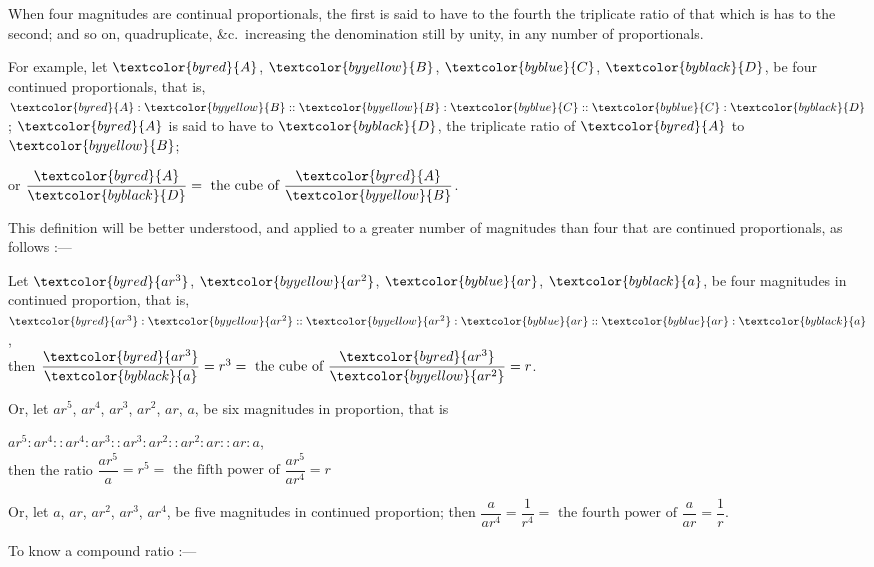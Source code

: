 \documentclass[booklanguage=english]{byrnebook}
\begin{document}
\vfill\pagebreak

\def\varA{\textcolor{byred}{A}}
\def\varB{\textcolor{byyellow}{B}}
\def\varC{\textcolor{byblue}{C}}
\def\varD{\textcolor{byblack}{D}}
\def\vararQ{\textcolor{byred}{ar^3}}
\def\vararS{\textcolor{byyellow}{ar^2}}
\def\varar{\textcolor{byblue}{ar}}
\def\vara{\textcolor{byblack}{a}}
When four magnitudes are continual proportionals, the first is said to have to the fourth the triplicate ratio of that which is has to the second; and so on, quadruplicate, \&c.\ increasing the denomination still by unity, in any number of proportionals.

For example, let $\varA$, $\varB$, $\varC$, $\varD$, be four continued proportionals, that is, $\varA : \varB :: \varB : \varC :: \varC : \varD$; $\varA$ is said to have to $\varD$, the triplicate ratio of $\varA$ to $\varB$;

\begin{center}
or $\dfrac{\varA}{\varD} = \mbox{ the cube of } \dfrac{\varA}{\varB}$.
\end{center}

This definition will be better understood, and applied to a greater number of magnitudes than four that are continued proportionals, as follows :—

\begin{center}
Let $\vararQ$, $\vararS$, $\varar$, $\vara$, be four magnitudes in continued proportion, that is, $\vararQ : \vararS :: \vararS : \varar :: \varar : \vara$,\\
then $\dfrac{\vararQ}{\vara} = r^3 = \mbox{ the cube of } \dfrac{\vararQ}{\vararS} = r$.
\end{center}

Or, let $ar^5$, $ar^4$, $ar^3$, $ar^2$, $ar$, $a$, be six magnitudes in proportion, that is

\begin{center}
$ar^5 : ar^4 :: ar^4 : ar^3 :: ar^3 : ar^2 :: ar^2 : ar :: ar : a$,\\
then the ratio $\dfrac{ar^5}{a} = r^5 = \mbox{ the fifth power of } \dfrac{ar^5}{ar^4} = r$
\end{center}

Or, let $a$, $ar$, $ar^2$, $ar^3$, $ar^4$, be five magnitudes in continued proportion; then $\dfrac{a}{ar^4} = \dfrac{1}{r^4} = \mbox{ the fourth power of } \dfrac{a}{ar} = \dfrac{1}{r}$.

\vfill\pagebreak

\def\varA{\textcolor{byred}{A}}
\def\varB{\textcolor{byred}{B}}
\def\varC{\textcolor{byred}{C}}
\def\varD{\textcolor{byred}{D}}
\def\varE{\textcolor{byblue}{E}}
\def\varF{\textcolor{byblue}{F}}
\def\varG{\textcolor{byblue}{G}}
\def\varH{\textcolor{byblue}{H}}
\def\varK{\textcolor{byblue}{K}}
\def\varL{\textcolor{byblue}{L}}
\def\varM{\textcolor{byyellow}{M}}
\def\varN{\textcolor{byyellow}{N}}
To know a compound ratio :—
\end{document}
